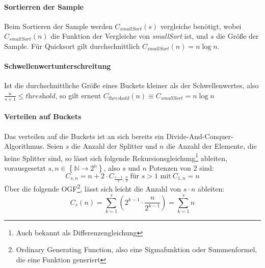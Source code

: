 		\paragraph{Sortierren der Sample}
			Beim Sortieren der Sample werden $C_\textit{smallSort}(s)$ vergleiche benötigt, wobei $C_\textit{smallSort}(n)$ die Funktion der Vergleiche von \textit{smallSort} ist, und $s$ die Größe der Sample.
			Für Quicksort gilt durchschnittlich $C_\textit{smallSort}(n)=n\log{n}$. \autocite{wikipedia-contributors-2022}
			
		\paragraph{Schwellenwertunterschreitung}
			Ist die durchschnittliche Größe eines Buckets kleiner als der Schwellenwertes, also $\frac{n}{s+1}\leq \textit{threshold}$, so gilt erneut $C_\textit{threshold}(n)\equiv C_\textit{smallSort}=n\log{n}$
		
		\paragraph{Verteilen auf Buckets}
			Das verteilen auf die Buckets ist an sich bereits ein Divide-And-Conquer-Algorithmus.
			Seien $s$ die Anzahl der Splitter und $n$ die Anzahl der Elemente, die keine Splitter sind, so lässt sich folgende Rekursionsgleichung\footnote{Auch bekannt als Differenzengleichung} ableiten, vorausgesetzt $s,n\in \left\{ \mathbb{N}\to 2^n \right\}$, also $s$ und $n$ Potenzen von 2 sind:
			\begin{equation}
				C_{s,n}=n+2\cdot C_{\frac{s-1}{2}, \frac{n}{2}}\ \text{für $s>1$ mit}\ C_{1,n}=n
			\end{equation}
			Über die folgende OGF\footnote{Ordinary Generating Function, also eine Sigmafunktion oder Summenformel, die eine Funktion generiert}, lässt sich leicht die Anzahl von $s\cdot n$ ableiten:
			\begin{equation}
				C_s(n)=\sum_{k=1}^{s}\left(2^{k-1}\cdot \frac{n}{2^{k-1}}\right)=\sum_{k=1}^{s}n
			\end{equation}
